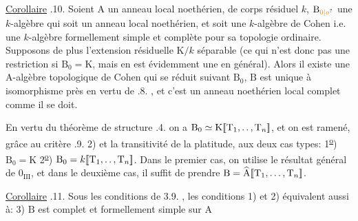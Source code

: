 
\uline{Corollaire} .10. Soient $\mathrm A$ un anneau local noethérien, de corps résiduel $k$, $\mathrm B_{\unsure{0|o}}$ une $k$-algèbre qui soit un anneau local noethérien, et soit une $k$-algèbre de Cohen i.e. une $k$-algèbre formellement simple  et complète pour sa topologie ordinaire. Supposons de plus l'extension résiduelle $\mathrm K/k$ séparable (ce qui n'est donc pas une restriction si $\mathrm B_0=\mathrm K$, mais en est évidemment une en général). Alors il existe une $\mathrm A$-algèbre topologique de Cohen  qui se réduit suivant $\mathrm B_0$, $\mathrm B$ est unique à isomorphisme près en vertu de .8. , et c'est un anneau noethérien local complet comme il se doit.

En vertu du théorème de structure .4. on a $\mathrm B_0\simeq\mathrm K[\![\mathrm T_1,\ldotp\ldotp,\mathrm T_n]\!]$, et on est ramené, grâce au critère .9. 2) et la transitivité de la platitude, aux deux cas types: 1\textsuperscript{\uline{o}}) $\mathrm B_0=\mathrm K$ 2\textsuperscript{\uline{o}}) $\mathrm B_0=k[\![\mathrm T_1,\ldotp\ldotp,\mathrm T_n]\!]$. Dans le premier cas, on utilise le résultat général de $0_{\mathrm{III}}$, et dans le deuxième cas, il suffit de prendre $\mathrm B=\widehat{\mathrm A}[\![\mathrm T_1,\ldots,\mathrm T_n]\!]$.

 \uline{Corollaire} .11. Sous les conditions de 3.9. ,  les conditions 1) et 2) équivalent aussi à: 3) $\mathrm B$ est complet et formellement simple sur $\mathrm A$

